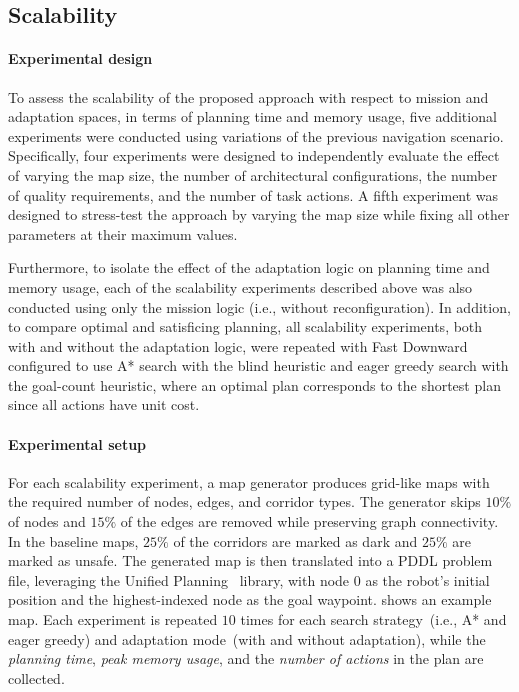 \subsection{Scalability}\label{planta:sec:scale_exp}

\paragraph{Experimental design} To assess the scalability of the proposed approach with respect to mission and adaptation spaces, in terms of planning time and memory usage, five additional experiments were conducted using variations of the previous navigation scenario. Specifically, four experiments were designed to independently evaluate the effect of varying the map size, the number of architectural configurations, the number of quality requirements, and the number of task actions. A fifth experiment was designed to stress-test the approach by varying the map size while fixing all other parameters at their maximum values.

Furthermore, to isolate the effect of the adaptation logic on planning time and memory usage, each of the scalability experiments described above was also conducted using only the mission logic (i.e., without reconfiguration). In addition, to compare optimal and satisficing planning, all scalability experiments, both with and without the adaptation logic, were repeated with Fast Downward configured to use A* search with the blind heuristic and eager greedy search with the goal-count heuristic, where an optimal plan corresponds to the shortest plan since all actions have unit cost.

\paragraph{Experimental setup}

For each scalability experiment, a map generator produces grid-like maps with the required number of nodes, edges, and corridor types. The generator skips $10\%$ of nodes and $15\%$ of the edges are removed while preserving graph connectivity. In the baseline maps, $25\%$ of the corridors are marked as dark and $25\%$ are marked as unsafe. The generated map is then translated into a PDDL problem file, leveraging the Unified Planning~\cite{unified_planning_2025_micheli} library, with node $0$ as the robot's initial position and the highest-indexed node as the goal waypoint.  shows an example map. Each experiment is repeated $10$ times for each search strategy~(i.e., A* and eager greedy) and adaptation mode~(with and without adaptation), while the \emph{planning time}, \emph{peak memory usage}, and the \emph{number of actions} in the plan are collected.

